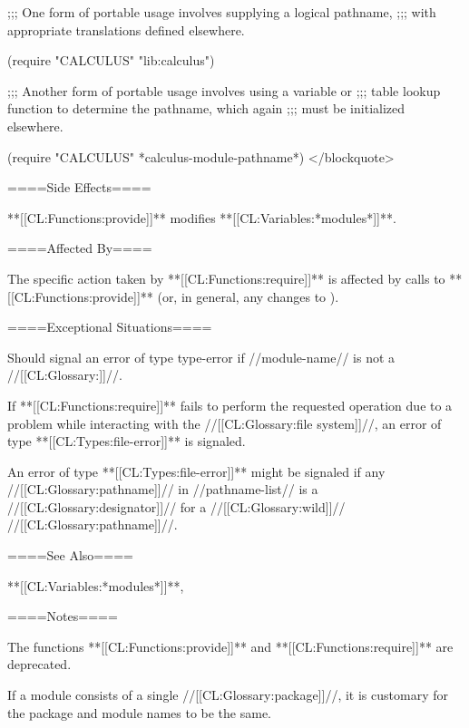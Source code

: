 ;;; One form of portable usage involves supplying a logical pathname, ;;; with appropriate translations defined elsewhere.

(require "CALCULUS" "lib:calculus")

;;; Another form of portable usage involves using a variable or ;;; table lookup function to determine the pathname, which again ;;; must be initialized elsewhere.

(require "CALCULUS" *calculus-module-pathname*) </blockquote>

====Side Effects====

**[[CL:Functions:provide]]** modifies **[[CL:Variables:*modules*]]**.

====Affected By====

The specific action taken by **[[CL:Functions:require]]** is affected by calls to **[[CL:Functions:provide]]** (or, in general, any changes to ).

====Exceptional Situations====

Should signal an error of type type-error if //module-name// is not a //[[CL:Glossary:\symbolnamedesignator]]//.

If **[[CL:Functions:require]]** fails to perform the requested operation due to a problem while interacting with the //[[CL:Glossary:file system]]//, an error of type **[[CL:Types:file-error]]** is signaled.

An error of type **[[CL:Types:file-error]]** might be signaled if any //[[CL:Glossary:pathname]]// in //pathname-list// is a //[[CL:Glossary:designator]]// for a //[[CL:Glossary:wild]]// //[[CL:Glossary:pathname]]//.

====See Also====

**[[CL:Variables:*modules*]]**,

{\secref\PathnamesAsFilenames}

====Notes====

The functions **[[CL:Functions:provide]]** and **[[CL:Functions:require]]** are deprecated.

If a module consists of a single //[[CL:Glossary:package]]//, it is customary for the package and module names to be the same.

       
